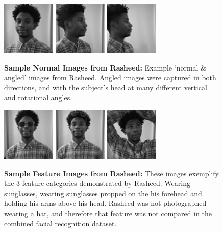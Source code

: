 \documentclass[conference,11pt]{IEEEtran}
\begin{document}
\begin{figure}[ht]
    \centering
    \includegraphics[width=1in]{pictures/rasheed/normalStraight.jpg}
    \includegraphics[width=1in]{pictures/rasheed/45deg.jpg}
    \includegraphics[width=1in]{pictures/rasheed/90deg.jpg}
    \caption{\textbf{Sample Normal Images from Rasheed:} Example `normal \& angled' images from Rasheed. Angled images were captured in both directions, and with the subject's head at many different vertical and rotational angles.}
\end{figure}

\begin{figure}[H]
    \centering
    \includegraphics[width=1in]{pictures/rasheed/sunGlasses.jpg}
    \includegraphics[width=1in]{pictures/rasheed/glassesUp.jpg}
    \includegraphics[width=1in]{pictures/rasheed/armsUp.jpg}
    \caption{\textbf{Sample Feature Images from Rasheed:} These images exemplify the 3 feature categories demonstrated by Rasheed.  Wearing sunglasses, wearing sunglasses propped on the his forehead and holding his arms above his head. Rasheed was not photographed wearing a hat, and therefore that feature was not compared in the combined facial recognition dataset.}
\end{figure}
\end{document}
